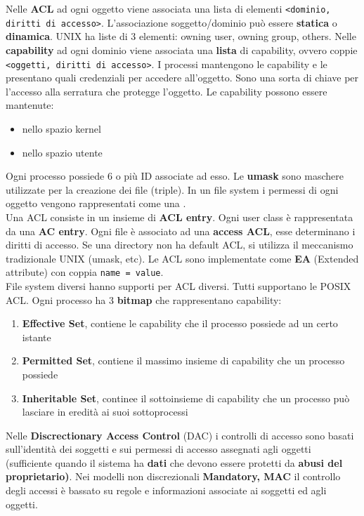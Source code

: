 \documentclass{article}
\begin{document}
Nelle \textbf{ACL} ad ogni oggetto viene associata una lista di elementi \texttt{<dominio, diritti di accesso>}. L'associazione soggetto/dominio può essere \textbf{statica} o \textbf{dinamica}. UNIX ha liste di $3$ elementi: owning user, owning group, others.
Nelle \textbf{capability} ad ogni dominio viene associata una \textbf{lista} di capability, ovvero coppie \texttt{<oggetti, diritti di accesso>}. I processi mantengono le capability e le presentano quali credenziali per accedere all'oggetto. Sono una sorta di chiave per l'accesso alla serratura che protegge l'oggetto.
Le capability possono essere mantenute:
\begin{itemize}
  \item nello spazio kernel
  \item nello spazio utente
\end{itemize}
Ogni processo possiede $6$ o più ID associate ad esso. Le \textbf{umask} sono maschere utilizzate per la creazione dei file (triple). In un file system i permessi di ogni oggetto vengono rappresentati come una .\\
Una ACL consiste in un insieme di \textbf{ACL entry}. Ogni user class è rappresentata da una \textbf{AC entry}. Ogni file è associato ad una \textbf{access ACL}, esse determinano i diritti di accesso. Se una directory non ha default ACL, si utilizza il meccanismo tradizionale UNIX (umask, etc). Le ACL sono implementate come \textbf{EA} (Extended attribute) con coppia \texttt{name = value}.\\
File system diversi hanno supporti per ACL diversi. Tutti supportano le POSIX ACL. Ogni processo ha $3$ \textbf{bitmap} che rappresentano capability:
\begin{enumerate}
  \item \textbf{Effective Set}, contiene le capability che il processo possiede ad un certo istante
  \item \textbf{Permitted Set}, contiene il massimo insieme di capability che un processo possiede
  \item \textbf{Inheritable Set}, continee il sottoinsieme di capability che un processo può lasciare in eredità ai suoi sottoprocessi
\end{enumerate}
Nelle \textbf{Discrectionary Access Control} (DAC) i controlli di accesso sono basati sull'identità dei soggetti e sui permessi di accesso assegnati agli oggetti (sufficiente quando il sistema ha \textbf{dati} che devono essere protetti da \textbf{abusi del proprietario)}. Nei modelli non discrezionali \textbf{Mandatory, MAC} il controllo degli accessi è bassato su regole e informazioni associate ai soggetti ed agli oggetti.
  
\end{document}
